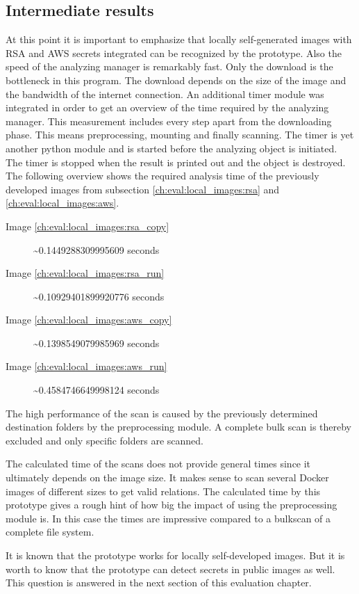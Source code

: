 \subsection{Intermediate results}
At this point it is important to emphasize that locally self-generated images with RSA and AWS secrets integrated can be recognized by the prototype.
Also the speed of the analyzing manager is remarkably fast. 
Only the download is the bottleneck in this program. 
The download depends on the size of the image and the bandwidth of the internet connection.
An additional timer module was integrated in order to get an overview of the time required by the analyzing manager.
This measurement includes every step apart from the downloading phase. This means preprocessing, mounting and finally scanning.
The timer is yet another python module and is started before the analyzing object is initiated. 
The timer is stopped when the result is printed out and the object is destroyed.
The following overview shows the required analysis time of the previously developed images from subsection \ref{ch:eval:local_images:rsa} and \ref{ch:eval:local_images:aws}. 
\begin{description}
\item [Image \ref{ch:eval:local_images:rsa_copy}] \textasciitilde 0.1449288309995609 seconds
\item [Image \ref{ch:eval:local_images:rsa_run}] \textasciitilde 0.10929401899920776 seconds
\item [Image \ref{ch:eval:local_images:aws_copy}] \textasciitilde 0.1398549079985969 seconds
\item [Image \ref{ch:eval:local_images:aws_run}] \textasciitilde 0.4584746649998124 seconds
\end{description}
The high performance of the scan is caused by the previously determined destination folders by the preprocessing module.
A complete bulk scan is thereby excluded and only specific folders are scanned.

The calculated time of the scans does not provide general times since it ultimately depends on the image size. 
It makes sense to scan several Docker images of different sizes to get valid relations.
The calculated time by this prototype gives a rough hint of how big the impact of using the preprocessing module is.
In this case the times are impressive compared to a bulkscan of a complete file system.

It is known that the prototype works for locally self-developed images. 
But it is worth to know that the prototype can detect secrets in public images as well.
This question is answered in the next section of this evaluation chapter.